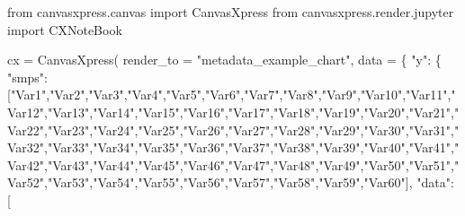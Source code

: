 \documentclass[
  letterpaper,
  DIV=11,
  numbers=noendperiod]{scrartcl}
\newenvironment{Shaded}{\begin{snugshade}}{\end{snugshade}}
\newcommand{\ImportTok}[1]{\textcolor[rgb]{0.00,0.46,0.62}{#1}}
\newcommand{\NormalTok}[1]{\textcolor[rgb]{0.00,0.23,0.31}{#1}}
\newcommand{\OperatorTok}[1]{\textcolor[rgb]{0.37,0.37,0.37}{#1}}
\newcommand{\StringTok}[1]{\textcolor[rgb]{0.13,0.47,0.30}{#1}}
\begin{document}
\begin{Shaded}
\begin{Highlighting}[]
 \ImportTok{from}\NormalTok{ canvasxpress.canvas }\ImportTok{import}\NormalTok{ CanvasXpress}
 \ImportTok{from}\NormalTok{ canvasxpress.render.jupyter }\ImportTok{import}\NormalTok{ CXNoteBook}
 
\NormalTok{ cx }\OperatorTok{=}\NormalTok{ CanvasXpress(}
\NormalTok{   render\_to }\OperatorTok{=} \StringTok{"metadata\_example\_chart"}\NormalTok{,}
\NormalTok{   data }\OperatorTok{=}\NormalTok{ \{}
     \StringTok{"y"}\NormalTok{: \{}
       \StringTok{"smps"}\NormalTok{: [}\StringTok{"Var1"}\NormalTok{,}\StringTok{"Var2"}\NormalTok{,}\StringTok{"Var3"}\NormalTok{,}\StringTok{"Var4"}\NormalTok{,}\StringTok{"Var5"}\NormalTok{,}\StringTok{"Var6"}\NormalTok{,}\StringTok{"Var7"}\NormalTok{,}\StringTok{"Var8"}\NormalTok{,}\StringTok{"Var9"}\NormalTok{,}\StringTok{"Var10"}\NormalTok{,}\StringTok{"Var11"}\NormalTok{,}\StringTok{"Var12"}\NormalTok{,}\StringTok{"Var13"}\NormalTok{,}\StringTok{"Var14"}\NormalTok{,}\StringTok{"Var15"}\NormalTok{,}\StringTok{"Var16"}\NormalTok{,}\StringTok{"Var17"}\NormalTok{,}\StringTok{"Var18"}\NormalTok{,}\StringTok{"Var19"}\NormalTok{,}\StringTok{"Var20"}\NormalTok{,}\StringTok{"Var21"}\NormalTok{,}\StringTok{"Var22"}\NormalTok{,}\StringTok{"Var23"}\NormalTok{,}\StringTok{"Var24"}\NormalTok{,}\StringTok{"Var25"}\NormalTok{,}\StringTok{"Var26"}\NormalTok{,}\StringTok{"Var27"}\NormalTok{,}\StringTok{"Var28"}\NormalTok{,}\StringTok{"Var29"}\NormalTok{,}\StringTok{"Var30"}\NormalTok{,}\StringTok{"Var31"}\NormalTok{,}\StringTok{"Var32"}\NormalTok{,}\StringTok{"Var33"}\NormalTok{,}\StringTok{"Var34"}\NormalTok{,}\StringTok{"Var35"}\NormalTok{,}\StringTok{"Var36"}\NormalTok{,}\StringTok{"Var37"}\NormalTok{,}\StringTok{"Var38"}\NormalTok{,}\StringTok{"Var39"}\NormalTok{,}\StringTok{"Var40"}\NormalTok{,}\StringTok{"Var41"}\NormalTok{,}\StringTok{"Var42"}\NormalTok{,}\StringTok{"Var43"}\NormalTok{,}\StringTok{"Var44"}\NormalTok{,}\StringTok{"Var45"}\NormalTok{,}\StringTok{"Var46"}\NormalTok{,}\StringTok{"Var47"}\NormalTok{,}\StringTok{"Var48"}\NormalTok{,}\StringTok{"Var49"}\NormalTok{,}\StringTok{"Var50"}\NormalTok{,}\StringTok{"Var51"}\NormalTok{,}\StringTok{"Var52"}\NormalTok{,}\StringTok{"Var53"}\NormalTok{,}\StringTok{"Var54"}\NormalTok{,}\StringTok{"Var55"}\NormalTok{,}\StringTok{"Var56"}\NormalTok{,}\StringTok{"Var57"}\NormalTok{,}\StringTok{"Var58"}\NormalTok{,}\StringTok{"Var59"}\NormalTok{,}\StringTok{"Var60"}\NormalTok{],}
       \StringTok{"data"}\NormalTok{: [}

\end{Highlighting}
\end{Shaded}
\end{document}
